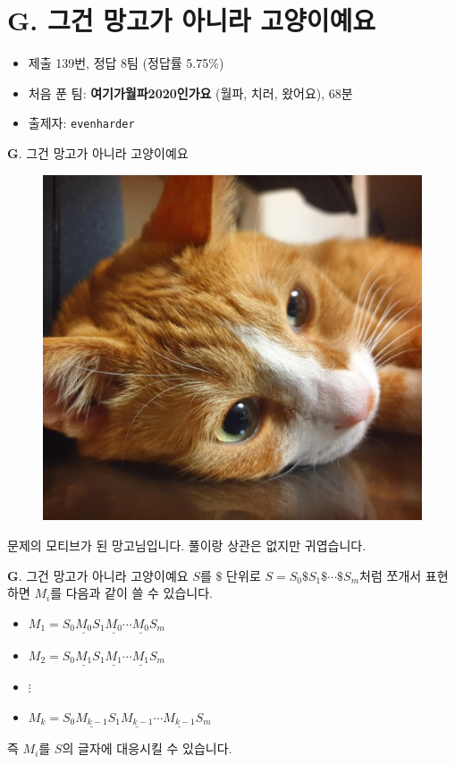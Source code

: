 \section{G. 그건 망고가 아니라 고양이예요}

\begin{frame} %
    \begin{itemize}
        \item 제출 139번, 정답 8팀 (정답률 5.75\%)
        \item 처음 푼 팀: \textbf{여기가월파2020인가요} (월파, 치러, 왔어요), 68분
        \item 출제자: \texttt{evenharder}
    \end{itemize}
\end{frame}

\begin{frame}{\textbf{G}. 그건 망고가 아니라 고양이예요}
    \begin{figure}[h!]
        \centering
        \includegraphics[width=0.35\linewidth]{../images/mango/mango_sleepy.png}
    \end{figure}
    
    문제의 모티브가 된 망고님입니다. 풀이랑 상관은 없지만 귀엽습니다.
\end{frame}

\begin{frame}{\textbf{G}. 그건 망고가 아니라 고양이예요}
    $S$를 $\$$ 단위로 $S = S_0\$ S_1 \$ \cdots \$ S_m$처럼 쪼개서 표현하면 $M_i$를 다음과 같이 쓸 수 있습니다.
    \begin{itemize}
        \item $M_1 = S_0 \underline{M_0} S_1 \underline{M_0} \cdots \underline{M_0} S_m$
        \item $M_2 = S_0 \underline{M_1} S_1 \underline{M_1} \cdots \underline{M_1} S_m$
        \item $ \vdots $
        \item $M_k = S_0 \underline{M_{k-1}} S_1 \underline{M_{k-1}} \cdots \underline{M_{k-1}} S_m$
    \end{itemize}
    즉 $M_i$를 $S$의 글자에 대응시킬 수 있습니다.
\end{frame}

